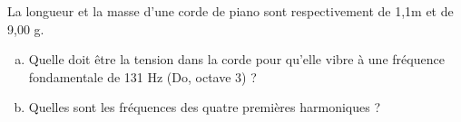 %
%
    La longueur et la masse d'une corde de piano sont respectivement de 1,1m et de 9,00 g.
    \begin{enumerate}[a)]
        \item Quelle doit être la tension dans la corde pour qu'elle vibre à une fréquence fondamentale de 131 Hz (Do, octave 3) ?
        \item Quelles sont les fréquences des quatre premières harmoniques ?
    \end{enumerate}
